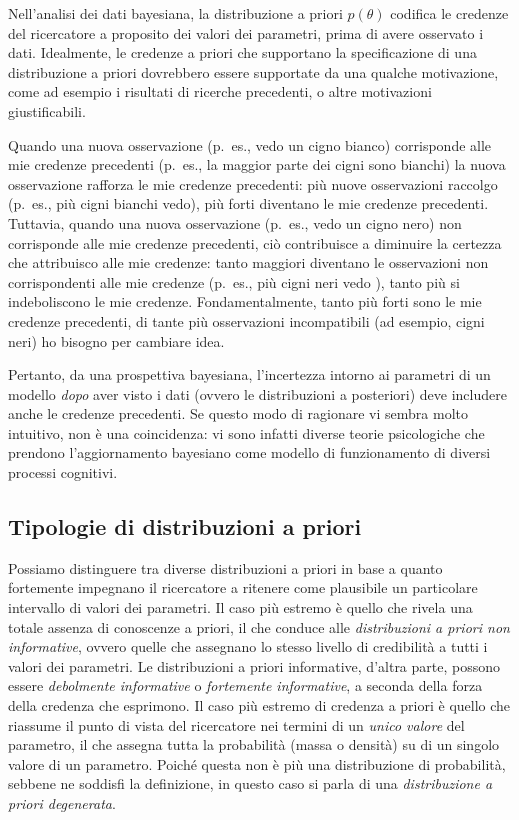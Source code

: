 \documentclass[
  10pt,
  italian,
  a4paper,
  extrafontsizes,onecolumn,openright
  ]{memoir}
\theoremstyle{definition}
\theoremstyle{definition}
\theoremstyle{definition}
\theoremstyle{definition}
\theoremstyle{remark}
\begin{document}
Nell'analisi dei dati bayesiana, la distribuzione a priori \(p(\theta)\) codifica le credenze del ricercatore a proposito dei valori dei parametri, prima di avere osservato i dati. Idealmente, le credenze a priori che supportano la specificazione di una distribuzione a priori dovrebbero essere supportate da una qualche motivazione, come ad esempio i risultati di ricerche precedenti, o altre motivazioni giustificabili.

Quando una nuova osservazione (p.~es., vedo un cigno bianco) corrisponde alle mie credenze precedenti (p.~es., la maggior parte dei cigni sono bianchi) la nuova osservazione rafforza le mie credenze precedenti: più nuove osservazioni raccolgo (p.~es., più cigni bianchi vedo), più forti diventano le mie credenze precedenti.
Tuttavia, quando una nuova osservazione (p.~es., vedo un cigno nero) non corrisponde alle mie credenze precedenti, ciò contribuisce a diminuire la certezza che attribuisco alle mie credenze: tanto maggiori diventano le osservazioni non corrispondenti alle mie credenze (p.~es., più cigni neri vedo ), tanto più si indeboliscono le mie credenze. Fondamentalmente, tanto più forti sono le mie credenze precedenti, di tante più osservazioni incompatibili (ad esempio, cigni neri) ho bisogno per cambiare idea.

Pertanto, da una prospettiva bayesiana, l'incertezza intorno ai parametri di un modello \emph{dopo} aver visto i dati (ovvero le distribuzioni a posteriori) deve includere anche le credenze precedenti. Se questo modo di ragionare vi sembra molto intuitivo, non è una coincidenza: vi sono infatti diverse teorie psicologiche che prendono l'aggiornamento bayesiano come modello di funzionamento di diversi processi cognitivi.

\hypertarget{tipologie-di-distribuzioni-a-priori}{%
\subsection{Tipologie di distribuzioni a priori}\label{tipologie-di-distribuzioni-a-priori}}

Possiamo distinguere tra diverse distribuzioni a priori in base a quanto fortemente impegnano il ricercatore a ritenere come plausibile un particolare intervallo di valori dei parametri. Il caso più estremo è quello che rivela una totale assenza di conoscenze a priori, il che conduce alle \emph{distribuzioni a priori non informative}, ovvero quelle che assegnano lo stesso livello di credibilità a tutti i valori dei parametri. Le distribuzioni a priori informative, d'altra parte, possono essere \emph{debolmente informative} o \emph{fortemente informative}, a seconda della forza della credenza che esprimono. Il caso più estremo di credenza a priori è quello che riassume il punto di vista del ricercatore nei termini di un \emph{unico valore} del parametro, il che assegna tutta la probabilità (massa o densità) su di un singolo valore di un parametro. Poiché questa non è più una distribuzione di probabilità, sebbene ne soddisfi la definizione, in questo caso si parla di una \emph{distribuzione a priori degenerata}.
\end{document}
